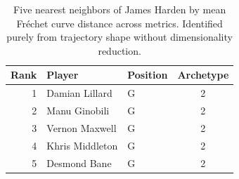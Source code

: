 \begin{table}[htbp]
  \centering\small
  \begin{tabular}{rllc}
    \toprule
    Rank & Player & Position & Archetype \\
    \midrule
    1 & Damian Lillard & G & 2 \\
    2 & Manu Ginobili & G & 2 \\
    3 & Vernon Maxwell & G & 2 \\
    4 & Khris Middleton & G & 2 \\
    5 & Desmond Bane & G & 2 \\
    \bottomrule
  \end{tabular}
  \caption{Five nearest neighbors of James Harden by mean Fr\'{e}chet curve distance across metrics. Identified purely from trajectory shape without dimensionality reduction.}
  \label{tab:James_Harden_frechet_curve_neighbors}
\end{table}

